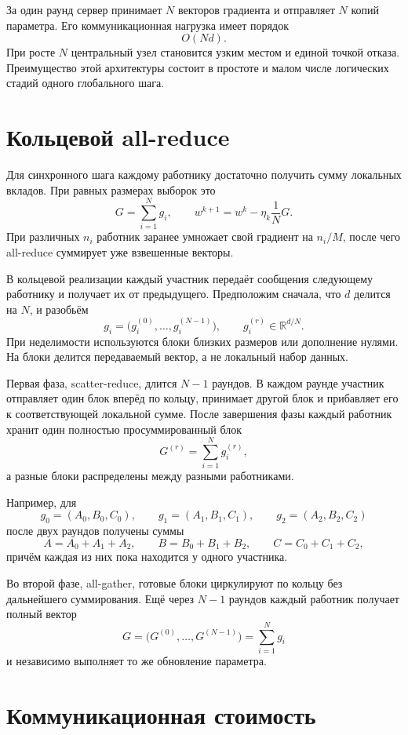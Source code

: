 За один раунд сервер принимает \(N\) векторов градиента и отправляет
\(N\) копий параметра. Его коммуникационная нагрузка имеет порядок
\[
    O(Nd).
\]
При росте \(N\) центральный узел становится узким местом и единой
точкой отказа. Преимущество этой архитектуры состоит в простоте и
малом числе логических стадий одного глобального шага.

\section{Кольцевой all-reduce}

Для синхронного шага каждому работнику достаточно получить сумму
локальных вкладов. При равных размерах выборок это
\[
    G=\sum_{i=1}^{N}g_i,
    \qquad
    w^{k+1}=w^k-\eta_k\frac1N G.
\]
При различных \(n_i\) работник заранее умножает свой градиент на
\(n_i/M\), после чего all-reduce суммирует уже взвешенные векторы.

В кольцевой реализации каждый участник передаёт сообщения следующему
работнику и получает их от предыдущего. Предположим сначала, что
\(d\) делится на \(N\), и разобьём
\[
    g_i
    =
    \bigl(g_i^{(0)},\ldots,g_i^{(N-1)}\bigr),
    \qquad
    g_i^{(r)}\in\mathbb R^{d/N}.
\]
При неделимости используются блоки близких размеров или дополнение
нулями. На блоки делится передаваемый вектор, а не локальный набор
данных.

Первая фаза, scatter-reduce, длится \(N-1\) раундов. В каждом раунде
участник отправляет один блок вперёд по кольцу, принимает другой блок
и прибавляет его к соответствующей локальной сумме. После завершения
фазы каждый работник хранит один полностью просуммированный блок
\[
    G^{(r)}=\sum_{i=1}^{N}g_i^{(r)},
\]
а разные блоки распределены между разными работниками.

Например, для
\[
    g_0=(A_0,B_0,C_0),\qquad
    g_1=(A_1,B_1,C_1),\qquad
    g_2=(A_2,B_2,C_2)
\]
после двух раундов получены суммы
\[
    A=A_0+A_1+A_2,\qquad
    B=B_0+B_1+B_2,\qquad
    C=C_0+C_1+C_2,
\]
причём каждая из них пока находится у одного участника.

Во второй фазе, all-gather, готовые блоки циркулируют по кольцу без
дальнейшего суммирования. Ещё через \(N-1\) раундов каждый работник
получает полный вектор
\[
    G
    =
    \bigl(G^{(0)},\ldots,G^{(N-1)}\bigr)
    =
    \sum_{i=1}^{N}g_i
\]
и независимо выполняет то же обновление параметра.

\section{Коммуникационная стоимость}

